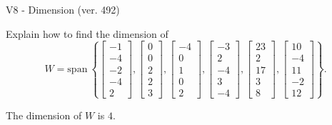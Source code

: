 \begin{exercise}
  \begin{exerciseTitle}V8 - Dimension (ver. 492)\end{exerciseTitle}
  \begin{exerciseStatement}
    Explain how to find the dimension of 
\[W=\mathrm{span}\ \left\{\left[\begin{array}{r}
-1 \\
-4 \\
-2 \\
-4 \\
2
\end{array}\right] , \left[\begin{array}{r}
0 \\
0 \\
2 \\
2 \\
3
\end{array}\right] , \left[\begin{array}{r}
-4 \\
0 \\
1 \\
0 \\
2
\end{array}\right] , \left[\begin{array}{r}
-3 \\
2 \\
-4 \\
3 \\
-4
\end{array}\right] , \left[\begin{array}{r}
23 \\
2 \\
17 \\
3 \\
8
\end{array}\right] , \left[\begin{array}{r}
10 \\
-4 \\
11 \\
-2 \\
12
\end{array}\right]\right\}.\]



  \end{exerciseStatement}
  \begin{exerciseAnswer}
   The dimension of \(W\) is  \(4\).
  


  \end{exerciseAnswer}
\end{exercise}